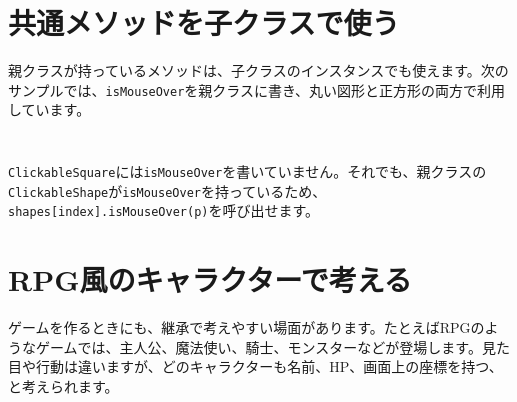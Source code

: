 \section{共通メソッドを子クラスで使う}

親クラスが持っているメソッドは、子クラスのインスタンスでも使えます。次のサンプルでは、\texttt{isMouseOver}を親クラスに書き、丸い図形と正方形の両方で利用しています。

\begin{listing}[htbp]
\inputminted[firstline=1,lastline=43]{ts}{typescript-p5/listings/chapter14/clickable-shapes.ts}
\caption{マウス判定を持つ親クラスと正方形の子クラス（\texttt{chapter14/clickable-shapes.ts}）}
\label{lst:chapter14-clickable-shapes-classes}
\end{listing}

\begin{listing}[htbp]
\inputminted[firstline=45,lastline=71]{ts}{typescript-p5/listings/chapter14/clickable-shapes.ts}
\caption{共通のマウス判定を使うスケッチ（\texttt{chapter14/clickable-shapes.ts}）}
\label{lst:chapter14-clickable-shapes-sketch}
\end{listing}

\texttt{ClickableSquare}には\texttt{isMouseOver}を書いていません。それでも、親クラスの\texttt{ClickableShape}が\texttt{isMouseOver}を持っているため、\texttt{shapes[index].isMouseOver(p)}を呼び出せます。

\section{RPG風のキャラクターで考える}

ゲームを作るときにも、継承で考えやすい場面があります。たとえばRPGのようなゲームでは、主人公、魔法使い、騎士、モンスターなどが登場します。見た目や行動は違いますが、どのキャラクターも名前、HP、画面上の座標を持つ、と考えられます。

